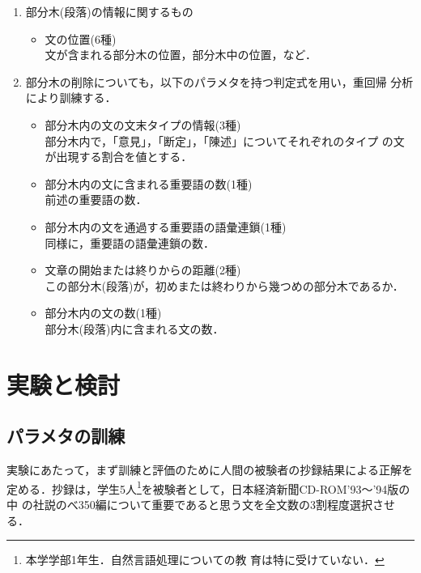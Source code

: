 \begin{enumerate}
\begin{itemize}
\end{itemize}

 \item 部分木(段落)の情報に関するもの

\begin{itemize}
 \item 文の位置(6種)\\
       文が含まれる部分木の位置，部分木中の位置，など．

\end{itemize}


 \item 部分木の削除についても，以下のパラメタを持つ判定式を用い，重回帰
       分析により訓練する．

\begin{itemize}
 \item 部分木内の文の文末タイプの情報(3種)\\
       部分木内で，「意見」，「断定」，「陳述」についてそれぞれのタイプ
       の文が出現する割合を値とする．

 \item 部分木内の文に含まれる重要語の数(1種)\\
       前述の重要語の数．
       
 \item 部分木内の文を通過する重要語の語彙連鎖(1種)\\
	同様に，重要語の語彙連鎖の数．

 \item 文章の開始または終りからの距離(2種)\\
       この部分木(段落)が，初めまたは終わりから幾つめの部分木であるか．

 \item 部分木内の文の数(1種)\\
       部分木(段落)内に含まれる文の数．
\end{itemize}
\end{enumerate}


\section{実験と検討}\label{experiment}

\subsection{パラメタの訓練}

実験にあたって，まず訓練と評価のために人間の被験者の抄録結果による正解を
定める．抄録は，学生5人\footnote{本学学部1年生．自然言語処理についての教
育は特に受けていない．}を被験者として，日本経済新聞CD-ROM'93〜'94版の中
の社説のべ350編について重要であると思う文を全文数の3割程度選択させる．

